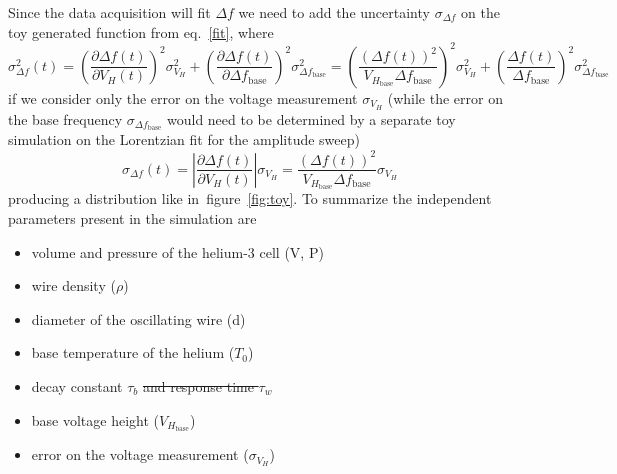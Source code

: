 \documentclass[a4paper,12pt]{article}
\begin{document}
Since the data acquisition will fit $\Delta f$ we need to add the uncertainty $\sigma_{\Delta f}$ on the toy generated function from eq.~\ref{fit}, where
\begin{equation}
\sigma^2_{\Delta f}(t) = \left( \frac{\partial \Delta f(t)}{\partial V_H(t)} \right)^2 \sigma^2_{V_H} + \left( \frac{\partial \Delta f(t)}{\partial \Delta f_\mathrm{base}} \right)^2 \sigma^2_{\Delta f_\mathrm{base}} = \left( \frac{(\Delta f(t))^2}{V_{H_{\mathrm{base}}} \Delta f_\mathrm{base}} \right)^2 \sigma^2_{V_H} + \left( \frac{\Delta f(t)}{\Delta f_\mathrm{base}}\right)^2 \sigma^2_{\Delta f_\mathrm{base}}
\end{equation}
if we consider only the error on the voltage measurement $\sigma_{V_H}$ (while the error on the base frequency $\sigma_{\Delta f_\mathrm{base}}$ would need to be determined by a separate toy simulation on the Lorentzian fit for the amplitude sweep)
\begin{equation}
\sigma_{\Delta f}(t) = \left| \frac{\partial \Delta f(t)}{\partial V_H(t)} \right| \sigma_{V_H} = \frac{(\Delta f(t))^2}{V_{H_{\mathrm{base}}} \Delta f_\mathrm{base}} \sigma_{V_H}
\end{equation}
producing a distribution like in~figure~\ref{fig:toy}. To summarize the independent parameters present in the simulation are

\begin{itemize}
  \item volume and pressure of the helium-3 cell (V, P)
  \item wire density ($\rho$)
  \item diameter of the oscillating wire (d)
  \item base temperature of the helium ($T_0$)
  \item decay constant $\tau_b$ \st{and response time $\tau_w$}
  \item base voltage height ($V_{H_\mathrm{base}}$)
  \item error on the voltage measurement ($\sigma_{V_H}$)
\end{itemize}
\end{document}

